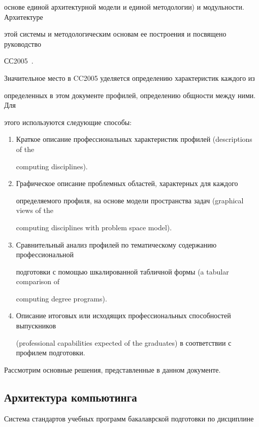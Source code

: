 основе единой архитектурной модели и единой методологии) и модульности. Архитектуре 

этой системы и методологическим основам ее построения и посвящено руководство 

СС2005~\cite{11-s}.



Значительное место в CC2005 уделяется определению характеристик каждого из 

определенных в этом документе профилей, определению общности между ними. Для 

этого используются следующие способы:

\begin{enumerate}[1.]

\item  Краткое описание профессиональных характеристик профилей (descriptions of the 

computing disciplines).

\item Графическое описание проблемных областей, характерных для каждого 

определяемого профиля, на основе модели пространства задач (graphical views of the 

computing disciplines with problem space model).

\item Сравнительный анализ профилей по тематическому содержанию профессиональной 

подготовки с помощью шкалированной табличной формы (a tabular comparison of 

computing degree programs).

\item Описание итоговых или исходящих профессиональных способностей выпускников 

(professional capabilities expected of the graduates) в соответствии с профилем подготовки.

\end{enumerate}



Рассмотрим основные решения, представленные в данном документе.



\subsection{Архитектура компьютинга}



      Система стандартов учебных программ бакалаврской подготовки по дис\-цип\-ли\-не 

